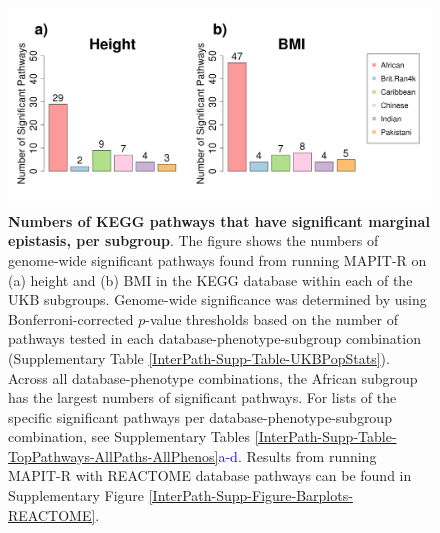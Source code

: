 \documentclass[10pt,a4paper]{article}
\begin{document}
\begin{figure}[htb]
\centering
\hspace*{-.9cm}
\includegraphics[scale=.45]{Images/Main/InterPath_Main_Figure_Barplots_KEGG_vs4.png}
\caption[TBD]{\textbf{Numbers of KEGG pathways that have significant marginal epistasis, per subgroup}. The figure shows the numbers of genome-wide significant pathways found from running MAPIT-R on (a) height and (b) BMI in the KEGG database within each of the UKB subgroups.  Genome-wide significance was determined by using Bonferroni-corrected $p$-value thresholds based on the number of pathways tested in each database-phenotype-subgroup combination (Supplementary Table \ref{InterPath-Supp-Table-UKBPopStats}). Across all database-phenotype combinations, the African subgroup has the largest numbers of significant pathways. For lists of the specific significant pathways per database-phenotype-subgroup combination, see Supplementary Tables \ref{InterPath-Supp-Table-TopPathways-AllPaths-AllPhenos}\textcolor{blue}{a-d}. Results from running MAPIT-R with REACTOME database pathways can be found in Supplementary Figure \ref{InterPath-Supp-Figure-Barplots-REACTOME}.}
\label{InterPath-Main-Figure-Barplots-KEGG}
\end{figure}
\end{document}
